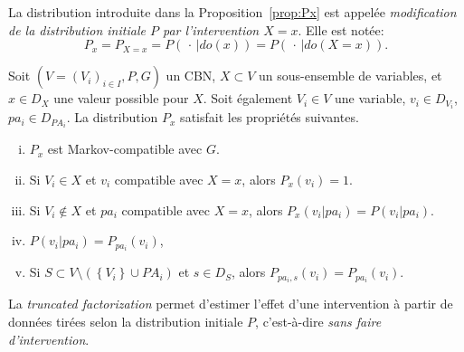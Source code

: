\begin{definition}
La distribution introduite dans la Proposition~\ref{prop:Px} est appelée \emph{modification de la distribution initiale $P$ par l'intervention $X=x$}.
Elle est notée:
\[ P_x=P_{X=x}=P(\,\cdot\,|do(x))=P(\,\cdot\,|do(X=x)). \]
\end{definition}

\begin{proposition}
Soit $(V=(V_i)_{i\in I},P,G)$ un CBN, $X\subset V$ un sous-ensemble de variables, et $x\in D_X$ une valeur possible pour $X$.
Soit également $V_i\in V$ une variable, $v_i\in D_{V_i}$, $pa_i\in D_{PA_i}$.
La distribution $P_x$ satisfait les propriétés suivantes.
\begin{enumerate}[(i)]
\item\label{item:1} $P_x$ est Markov-compatible avec $G$.
\item\label{item:2} Si $V_i\in X$ et $v_i$ compatible avec $X=x$, alors $P_x(v_i)=1$.
\item\label{item:3} Si $V_i\not \in X$ et $pa_i$ compatible avec $X=x$, alors $P_x(v_i|pa_i)=P(v_i|pa_i)$.
\item $P(v_i|pa_i)=P_{pa_i}(v_i)$,
\item Si $S\subset V\setminus (\left\{ V_i \right\}\cup PA_i)$ et $s\in D_S$, alors $P_{pa_i,s}(v_i)=P_{pa_i}(v_i)$.
\end{enumerate} 
\end{proposition}

\begin{remark}
La \emph{truncated factorization} permet d'estimer l'effet d'une intervention à partir de données tirées selon la distribution initiale $P$, c'est-à-dire \emph{sans faire d'intervention}.
\end{remark}

